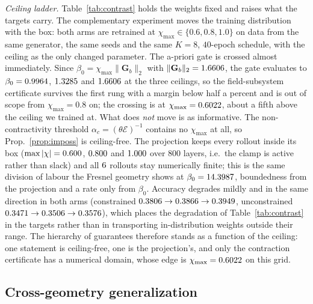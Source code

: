 \documentclass[journal,cmes,article,submit,moreauthors,pdftex]{Definitions/tsp}
\newcommand{\norm}[1]{\lVert #1 \rVert}
\newcommand{\numv}[1]{#1}
\begin{document}
\emph{Ceiling ladder.} Table~\ref{tab:contrast} holds the weights fixed and raises what the
targets carry. The complementary experiment moves the training distribution with the box: both
arms are retrained at $\chi_{\max}\in\{0.6,0.8,1.0\}$ on data from the same generator, the same
seeds and the same $K=8$, $40$-epoch schedule, with the ceiling as the only changed parameter.
The a-priori gate is crossed almost immediately. Since
$\beta_0=\chi_{\max}\norm{\mathbf{G}_b}_2$ with $\norm{\mathbf{G}_b}_2=\numv{\NumBoxGb}$, the gate
evaluates to $\beta_0=\numv{\NumBoxBetaSixty}$, $\numv{\NumBoxBetaEighty}$ and
$\numv{\NumBoxBetaHundred}$ at
the three ceilings, so the field-subsystem certificate survives the first rung with a margin below
half a percent and is out of scope from $\chi_{\max}=0.8$ on; the crossing is at
$\chi_{\max}=\numv{\NumBoxEdge}$, about a fifth above the ceiling we trained at. What does
\emph{not} move is as informative. The non-contractivity threshold $\alpha_c=(\theta\mathcal{E})^{-1}$
contains no $\chi_{\max}$ at all, so Prop.~\ref{prop:imposs} is ceiling-free. The projection keeps
every rollout inside its box ($\max|\chi|=\numv{\NumBoxChiConsSixty}$,
$\numv{\NumBoxChiConsEighty}$ and $\numv{\NumBoxChiConsHundred}$ over $800$ layers, i.e.\ the
clamp is active rather than slack) and all $\numv{\NumBoxRuns}$ rollouts stay numerically finite;
this is the same division of labour the Fresnel geometry shows at
$\beta_0=\numv{\NumFresnelBeta}$, boundedness from the projection and a rate only from
$\beta_0$. Accuracy degrades mildly and in the same direction in both arms (constrained
$\numv{\NumBoxRreConsSixty}\to\numv{\NumBoxRreConsEighty}\to\numv{\NumBoxRreConsHundred}$,
unconstrained $\numv{\NumBoxRreUncSixty}\to\numv{\NumBoxRreUncEighty}\to\numv{\NumBoxRreUncHundred}$),
which places the degradation of Table~\ref{tab:contrast} in the targets rather than in
transporting in-distribution weights outside their range. The hierarchy of guarantees therefore
stands as a function of the ceiling: one statement is ceiling-free, one is the projection's, and
only the contraction certificate has a numerical domain, whose edge is
$\chi_{\max}=\numv{\NumBoxEdge}$ on this grid.

\subsection{Cross-geometry generalization}
\label{sec:geom}
\end{document}
